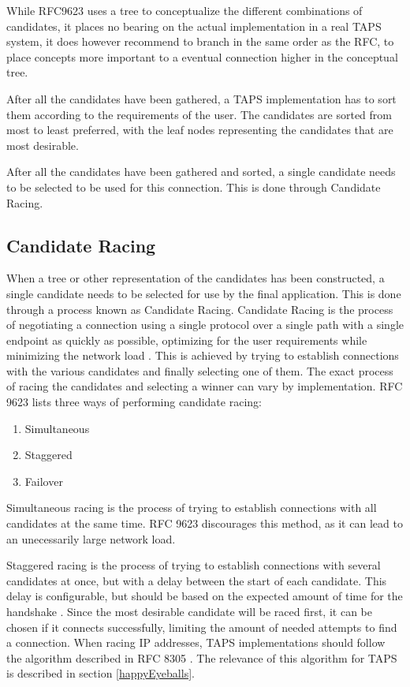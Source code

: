 While RFC9623 uses a tree to conceptualize the different combinations
of candidates, it places no bearing on the actual implementation
in a real TAPS system, it does however recommend to branch in the
same order as the RFC, to place concepts more important to a
eventual connection higher in the conceptual tree.

After all the candidates have been gathered, a TAPS implementation
has to sort them according to the requirements of the user. The
candidates are sorted from most to least preferred, with the
leaf nodes representing the candidates that are most desirable.

After all the candidates have been gathered and sorted, a single candidate
needs to be selected to be used for this connection. This is done
through Candidate Racing.


\subsection{Candidate Racing} \label{candidateRacing}
When a tree or other representation of the candidates has
been constructed, a single candidate needs to be selected for use
by the final application. This is done through a process known as
Candidate Racing. Candidate Racing is the process of negotiating
a connection using a single protocol over a single path with
a single endpoint as quickly as possible, optimizing for the
user requirements while minimizing the network load \cite{brunstromImplementingInterfacesTransport2025}.
This is achieved by trying to establish connections with
the various candidates and finally selecting one of them.
The exact process of racing the candidates and selecting
a winner can vary by implementation. RFC 9623 lists three
ways of performing candidate racing:

\begin{enumerate}
    \item Simultaneous
    \item Staggered
    \item Failover
\end{enumerate}

Simultaneous racing is the process of trying to establish
connections with all candidates at the same time. RFC 9623
discourages this method, as it can lead to an unecessarily large
network load.

Staggered racing is the process of trying to establish connections
with several candidates at once, but with a delay between the start
of each candidate. This delay is configurable, but should be based
on the expected amount of time for the handshake \cite{brunstromImplementingInterfacesTransport2025}. 
Since the most desirable candidate will be raced first, it
can be chosen if it connects successfully, limiting the amount
of needed attempts to find a connection. When racing IP addresses,
TAPS implementations should follow the algorithm described
in RFC 8305 \cite{schinaziHappyEyeballsVersion2017}. The relevance
of this algorithm for TAPS is described in section \ref{happyEyeballs}.


